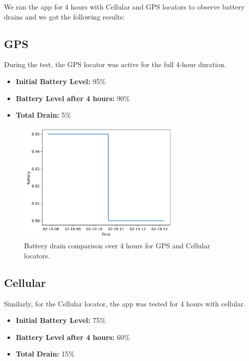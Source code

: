 \documentclass{lab}
\begin{document}
We ran the app for 4 hours with Cellular and GPS locators to observe battery drains and we got the following results: 
\subsection{GPS}
\label{subsec:GPS}
During the test, the GPS locator was active for the full 4-hour duration. 
\begin{itemize}
    \item \textbf{Initial Battery Level:} 95\%
    \item \textbf{Battery Level after 4 hours:} 90\%
    \item \textbf{Total Drain:} 5\%
\end{itemize}

\begin{figure}[h!]
    \centering
    \includegraphics[width=0.7\textwidth]{images/battery_over_time_gps.png}
    \caption{Battery drain comparison over 4 hours for GPS and Cellular locators.}
    \label{fig:battery_drain_gps}
\end{figure}


\subsection{Cellular}
\label{subsec:Cellular}
Similarly, for the Cellular locator, the app was tested for 4 hours with cellular. 
\begin{itemize}
    \item \textbf{Initial Battery Level:} 75\%
    \item \textbf{Battery Level after 4 hours:} 60\%
    \item \textbf{Total Drain:} 15\%
\end{itemize}
\end{document}
